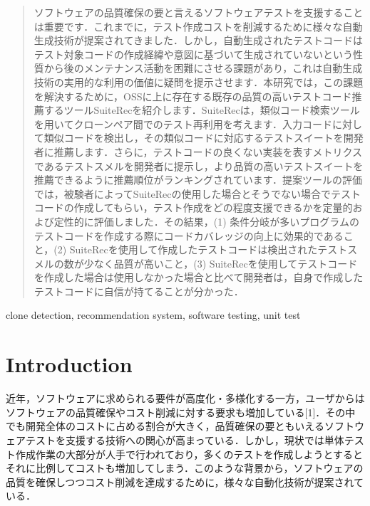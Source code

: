 \documentclass[conference]{IEEEtran}
\begin{document}
\begin{abstract}
ソフトウェアの品質確保の要と言えるソフトウェアテストを支援することは重要です．これまでに，テスト作成コストを削減するために様々な自動生成技術が提案されてきました．しかし，自動生成されたテストコードはテスト対象コードの作成経緯や意図に基づいて生成されていないという性質から後のメンテナンス活動を困難にさせる課題があり，これは自動生成技術の実用的な利用の価値に疑問を提示させます．本研究では，この課題を解決するために，OSSに上に存在する既存の品質の高いテストコード推薦するツールSuiteRecを紹介します．SuiteRecは，類似コード検索ツールを用いてクローンペア間でのテスト再利用を考えます．入力コードに対して類似コードを検出し，その類似コードに対応するテストスイートを開発者に推薦します．さらに，テストコードの良くない実装を表すメトリクスであるテストスメルを開発者に提示し，より品質の高いテストスイートを推薦できるように推薦順位がランキングされています．提案ツールの評価では，被験者によってSuiteRecの使用した場合とそうでない場合でテストコードの作成してもらい，テスト作成をどの程度支援できるかを定量的および定性的に評価しました．その結果，(1) 条件分岐が多いプログラムのテストコードを作成する際にコードカバレッジの向上に効果的であること，(2) SuiteRecを使用して作成したテストコードは検出されたテストスメルの数が少なく品質が高いこと，(3) SuiteRecを使用してテストコードを作成した場合は使用しなかった場合と比べて開発者は，自身で作成したテストコードに自信が持てることが分かった．

\end{abstract}

\begin{IEEEkeywords}
 clone detection, recommendation system, software testing, unit test 
\end{IEEEkeywords}

\section{Introduction}
近年，ソフトウェアに求められる要件が高度化・多様化する一方，ユーザからはソフトウェアの品質確保やコスト削減に対する要求も増加している[1]．その中でも開発全体のコストに占める割合が大きく，品質確保の要ともいえるソフトウェアテストを支援する技術への関心が高まっている．しかし，現状では単体テスト作成作業の大部分が人手で行われており，多くのテストを作成しようとするとそれに比例してコストも増加してしまう．このような背景から，ソフトウェアの品質を確保しつつコスト削減を達成するために，様々な自動化技術が提案されている．
\end{document}

